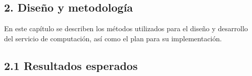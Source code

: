 \begin{spacing}{1.5}
  \begin{tightcenter}
    \section{2. Diseño y metodología}
    \mylinespacing
  \end{tightcenter}

    En este capítulo se describen los métodos utilizados para el diseño y
    desarrollo del servicio de computación, así como el plan para su
    implementación.

    \subsection{2.1 Resultados esperados}


\end{spacing}

